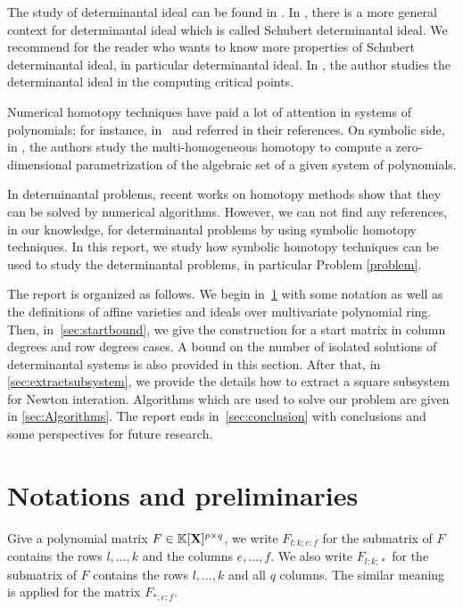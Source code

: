 \documentclass[11pt]{article}
\numberwithin{Property}{section}
\numberwithin{Theorem}{section}
\numberwithin{Proposition}{section}
\numberwithin{Lemma}{section}
\numberwithin{Corollary}{section}
\numberwithin{Definition}{section}
\numberwithin{Remark}{section}
\numberwithin{Conjecture}{section}
\numberwithin{Problem}{section}
\numberwithin{Claim}{section}
\theoremstyle{definition}
\numberwithin{Example}{section}
\newcommand{\field}{\mathbb{K}} %
\newcommand{\mat}[1]{\mathbf{\MakeUppercase{#1}}} %
\begin{document}
The study of determinantal ideal can be found in \cite{Miller04, Spa14}. In \cite[~Chapters 15--16]{Miller04}, there is a more general context for determinantal ideal which is called Schubert determinantal ideal. We recommend \cite[~Chapters 15--16]{Miller04} for the reader who wants to know more properties of Schubert determinantal ideal, in particular determinantal ideal. In \cite{Spa14}, the author studies the determinantal ideal in the computing critical points. 

Numerical homotopy techniques have paid a lot of attention in systems of polynomials; for instance, in~\cite{MORGAN872, MORGAN87, Morgan89,SAWC05,Zul88} and referred in their references. On symbolic side, in \cite{SaSc16}, the authors study the multi-homogeneous homotopy to compute a zero-dimensional parametrization of the algebraic set of a given system of polynomials. 

In determinantal problems, recent works on homotopy methods \cite{Ver89} show that they can be solved by numerical algorithms. However, we can not find any references, in our knowledge, for determinantal problems by using symbolic homotopy techniques. In this report, we study how symbolic homotopy techniques can be used to study the determinantal problems, in particular Problem \ref{problem}. 

The report is organized as follows. We begin in~\cref{sec:not} with some notation as well as the
definitions of affine varieties and ideals over multivariate polynomial ring. Then, in~\cref{sec:startbound}, we give the construction for a start matrix in column degrees and row degrees cases. A bound on the number of isolated solutions of determinantal systems is also provided in this section. After that, in \cref{sec:extractsubsystem}, we provide the details how to extract a square subsystem for Newton interation. Algorithms which are used to solve our problem are given in \cref{sec:Algorithms}. The report ends in~\cref{sec:conclusion} with conclusions and some perspectives for future research. 
\section{Notations and preliminaries}
\label{sec:not}
Give a polynomial matrix $F \in \field[\mat{X}]^{p \times q}$, we write $F_{l:k \mathbf{;} e:f}$ for the submatrix of $F$ contains the rows $l, \ldots, k$ and the columns $e, \ldots, f$. We also write $F_{l:k \mathbf{;} *}$ for the submatrix of $F$ contains the rows $l, \ldots, k$ and all $q$ columns. The similar meaning is applied for the matrix $F_{* \mathbf{;} e:f}$. 
\end{document}
